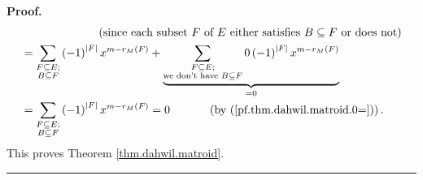 \documentclass[numbers=enddot,12pt,final,onecolumn,notitlepage]{scrartcl}%
\theoremstyle{definition}
\newenvironment{proof}[1][Proof]{\noindent\textbf{#1.} }{\ \rule{0.5em}{0.5em}}
\newenvironment{verlong}{}{}
\let\sumnonlimits\sum
\renewcommand{\sum}{\sumnonlimits\limits}
\begin{document}
\begin{verlong}
\begin{proof}
\begin{align*}
&  \ \ \ \ \ \ \ \ \ \ \ \ \ \ \ \ \ \ \ \ \left(  \text{since each subset
}F\text{ of }E\text{ either satisfies }B\subseteq F\text{ or does not}\right)
\\
&  =\sum_{\substack{F\subseteq E;\\B\subseteq F}}\left(  -1\right)
^{\left\vert F\right\vert }x^{m-r_{M}\left(  F\right)  }+\underbrace{\sum
_{\substack{F\subseteq E;\\\text{we don't have }B\subseteq F}}0\left(
-1\right)  ^{\left\vert F\right\vert }x^{m-r_{M}\left(  F\right)  }}_{=0}\\
&  =\sum_{\substack{F\subseteq E;\\B\subseteq F}}\left(  -1\right)
^{\left\vert F\right\vert }x^{m-r_{M}\left(  F\right)  }%
=0\ \ \ \ \ \ \ \ \ \ \left(  \text{by (\ref{pf.thm.dahwil.matroid.0=}%
)}\right)  .
\end{align*}
This proves Theorem \ref{thm.dahwil.matroid}.
\end{proof}
\end{verlong}
\end{document}

